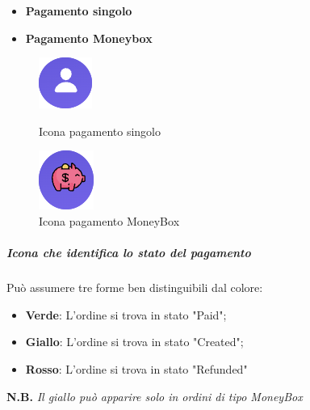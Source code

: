             \begin{itemize}
                \item \textbf{Pagamento singolo}
                \item \textbf{Pagamento Moneybox}
            \end{itemize}
            \begin{figure}[H]
                \centering
                \begin{minipage}{0.45\textwidth}
                    \centering
                    \includegraphics[scale=0.8]{immagini/Transaction/singleIcon.png} 
                    \caption{Icona pagamento singolo}
                \end{minipage}\hfill
                \begin{minipage}{0.45\textwidth}
                \centering
                    \includegraphics[scale=0.8]{immagini/Transaction/MoneyBoxIcon.png} 
                    \caption{Icona pagamento MoneyBox}
                \end{minipage}
            \end{figure}
            \subparagraph{Icona che identifica lo stato del pagamento}
            Può assumere tre forme ben distinguibili dal colore:
            \begin{itemize}
                \item \textbf{Verde}: L'ordine si trova in stato "Paid";
                \item \textbf{Giallo}: L'ordine si trova in stato "Created";
                \item \textbf{Rosso}: L'ordine si trova in stato "Refunded"
            \end{itemize}
            \textbf{N.B.} \textit{Il giallo può apparire solo in ordini di tipo MoneyBox}
